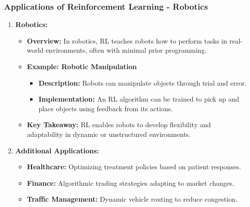 \documentclass[aspectratio=169]{beamer}
\begin{document}
\begin{frame}[fragile]
    \frametitle{Applications of Reinforcement Learning - Robotics}
    \begin{enumerate}
        \item \textbf{Robotics:}
        \begin{itemize}
            \item \textbf{Overview:} 
            In robotics, RL teaches robots how to perform tasks in real-world environments, often with minimal prior programming.
            \item \textbf{Example: Robotic Manipulation}
            \begin{itemize}
                \item \textbf{Description:} Robots can manipulate objects through trial and error.
                \item \textbf{Implementation:} An RL algorithm can be trained to pick up and place objects using feedback from its actions.
            \end{itemize}
            \item \textbf{Key Takeaway:} RL enables robots to develop flexibility and adaptability in dynamic or unstructured environments.
        \end{itemize}
        
        \item \textbf{Additional Applications:}
        \begin{itemize}
            \item \textbf{Healthcare:} Optimizing treatment policies based on patient responses.
            \item \textbf{Finance:} Algorithmic trading strategies adapting to market changes.
            \item \textbf{Traffic Management:} Dynamic vehicle routing to reduce congestion.
        \end{itemize}
    \end{enumerate}
\end{frame}
\end{document}
